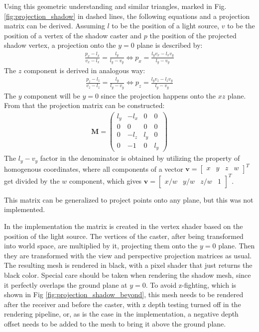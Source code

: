 Using this geometric understanding and similar triangles, marked in Fig. \ref{fig:projection_shadow} in dashed lines, the following equations and a projection matrix can be derived. Assuming \(l\) to be the position of a light source, \(v\) to be the position of a vertex of the shadow caster and \(p\) the position of the projected shadow vertex, a projection onto the \(y=0\) plane is described by:
\begin{align}
	\frac{p_x - l_x}{v_x - l_x} = \frac{l_y}{l_y - v_y} \Longleftrightarrow p_x = \frac{l_yv_x - l_xv_y}{l_y - v_y}
\end{align}
The \(z\) component is derived in analogous way:
\begin{align}
	\frac{p_z - l_z}{v_z - l_z} = \frac{l_y}{l_y - v_y} \Longleftrightarrow p_z = \frac{l_yv_z - l_zv_y}{l_y - v_y}
\end{align}
The \(y\) component will be \(y=0\) since the projection happens onto the \(xz\) plane. From that the projection matrix can be constructed:
\begin{align}
	\mathbf{M} = 
	\begin{pmatrix}
		l_y & -l_x & 0 & 0\\
		0 & 0 & 0 & 0\\
		0 & -l_z & l_y & 0\\
		0 & -1 & 0 & l_y
	\end{pmatrix}
\end{align}
The \(l_y - v_y\) factor in the denominator is obtained by utilizing the property of homogenous coordinates, where all components of a vector \(\mathbf{v} = \begin{bmatrix}x & y & z & w\end{bmatrix}^T\) get divided by the \(w\) component, which gives \(\mathbf{v} = \begin{bmatrix}x/w & y/w & z/w & 1\end{bmatrix}^T\).

This matrix can be generalized to project points onto any plane, but this was not implemented.

In the implementation the matrix is created in the vertex shader based on the position of the light source. The vertices of the caster, after being transformed into world space, are multiplied by it, projecting them onto the \(y=0\) plane. Then they are transformed with the view and perspective projection matrices as usual. The resulting mesh is rendered in black, with a pixel shader that just returns the black color. Special care should be taken when rendering the shadow mesh, since it perfectly overlaps the ground plane at \(y=0\). To avoid z-fighting, which is shown in Fig \ref{fig:projection_shadow_beyond}, this mesh needs to be rendered after the receiver and before the caster, with z depth testing turned off in the rendering pipeline, or, as is the case in the implementation, a negative depth offset needs to be added to the mesh to bring it above the ground plane.

